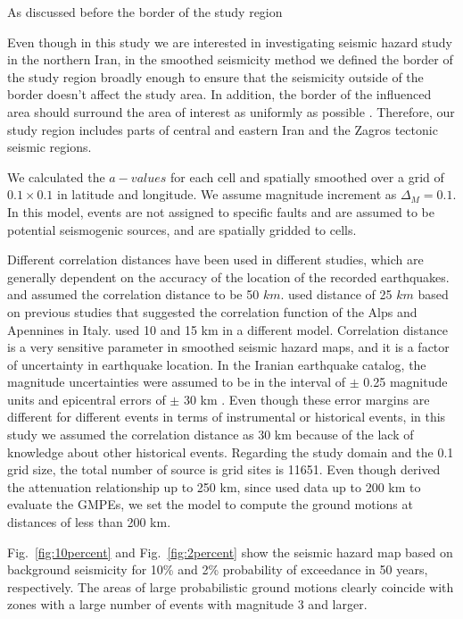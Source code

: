 As discussed before the border of the study region 

Even though in this study we are interested in investigating seismic hazard study in the northern Iran, in the smoothed seismicity method we defined the border of the study region broadly enough to ensure that the seismicity outside of the border doesn't affect the study area.  In addition, the border of the influenced area should surround the area of interest as uniformly as possible \citep{Lapajne1997}. Therefore, our study region includes parts of central and eastern Iran and the Zagros tectonic seismic regions.

We calculated the $a-values$ for each cell and spatially smoothed over a grid of $0.1 \times 0.1$ in latitude and longitude. We assume magnitude increment as $\Delta_M = 0.1$. In this model, events are not assigned to specific faults and are assumed to be potential seismogenic sources, and are spatially gridded to cells.

Different correlation distances have been used in different studies, which are generally dependent on the accuracy of the location of the recorded earthquakes. \citet{Frankel1995} and \citet{Boyd2008} assumed the correlation distance to be 50 $km$. \citet{Barani2007} used distance of 25 $km$ based on previous studies that suggested the correlation function of the Alps and Apennines in Italy. \citet{Foteva2006} used 10 and 15 km in a different model. Correlation distance is a very sensitive parameter in smoothed seismic hazard maps, and it is a factor of uncertainty in earthquake location. In the Iranian earthquake catalog, the magnitude uncertainties were assumed to be in the interval of $\pm$ 0.25 magnitude units and epicentral errors of $\pm$ 30 km \citep{Zare2012}. Even though these error margins are different for different events in terms of instrumental or historical events, in this study we assumed the correlation distance as 30 km because of the lack of knowledge about other historical events. Regarding the study domain and the 0.1 grid size, the total number of source is grid sites is 11651. Even though \citet{Kalkan2004} derived the attenuation relationship up to 250 km, since \citet{Zafarani2014} used data up to 200 km to evaluate the GMPEs, we set the model to compute the ground motions at distances of less than 200 km.

Fig.~\ref{fig:10percent} and Fig.~\ref{fig:2percent} show the seismic hazard map based on background seismicity for 10\% and 2\% probability of exceedance in 50 years, respectively. The areas of large probabilistic ground motions clearly coincide with zones with a large number of events with magnitude 3 and larger.
